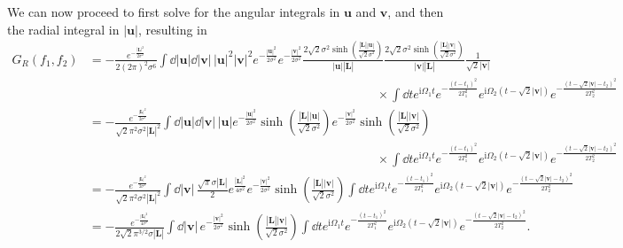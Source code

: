 \documentclass[letterpaper,12pt,titlepage,oneside,final]{book}
\newcommand{\ii}{\mathrm{i}}
\begin{document}
We can now proceed to first solve for the angular integrals in $\bm u$ and $\bm v$, and then the radial integral in $|\bm u|$, resulting in{\footnotesize
\begin{align}
    G_R(f_1,f_2) & = -\frac{e^{- \frac{|\bm L|^2}{2\sigma^2}}}{2(2\pi)^2 \sigma^6} \int   \dd |\bm u| \dd |\bm v| \,|\bm u|^2 |\bm v|^2 e^{-\frac{|\bm u|^2}{2\sigma^2}}e^{-\frac{|\bm v|^2}{2\sigma^2}} \frac{2\sqrt{2} \sigma^2\sinh(\frac{|\bm L||\bm u|}{\sqrt{2}\sigma^2})}{|\bm u||\bm L|}\frac{2\sqrt{2} \sigma^2\sinh(\frac{|\bm L||\bm v|}{\sqrt{2}\sigma^2})}{|\bm v||\bm L|}\frac{1}{\sqrt{2}|\bm v|}\nonumber \\
    &\:\:\:\:\:\:\:\:\:\:\:\:\:\:\:\:\:\:\:\:\:\:\:\:\:\:\:\:\:\:\:\:\:\:\:\:\:\:\:\:\:\:\:\:\:\:\:\:\:\:\:\:\:\:\:\:\:\:\:\:\:\:\:\:\:\:\:\:\:\:\:\:\:\:\:\:\:\:\:\:\:\:\:\:\:\:\:\:\:\:\:\:\:\:\:\:\:\:\:\:\:\:\:\:\:\times\int \dd t e^{\ii \Omega_1 t} e^{- \frac{(t-t_1)^2}{2T_1^2}}e^{\ii \Omega_2 (t - \sqrt{2}|\bm v|)} e^{- \frac{(t - \sqrt{2}|\bm v|-t_2)^2}{2T_2^2}}\nonumber\\
    & = -\frac{e^{- \frac{|\bm L|^2}{2\sigma^2}}}{\sqrt{2}\pi^2\sigma^2|\bm L|^2} \int  \dd |\bm u| \dd |\bm v| \,|\bm u| e^{-\frac{|\bm u|^2}{2\sigma^2}} \sinh(\frac{|\bm L||\bm u|}{\sqrt{2}\sigma^2})e^{-\frac{|\bm v|^2}{2\sigma^2}}\sinh(\frac{|\bm L||\bm v|}{\sqrt{2}\sigma^2})\nonumber\\
    &\:\:\:\:\:\:\:\:\:\:\:\:\:\:\:\:\:\:\:\:\:\:\:\:\:\:\:\:\:\:\:\:\:\:\:\:\:\:\:\:\:\:\:\:\:\:\:\:\:\:\:\:\:\:\:\:\:\:\:\:\:\:\:\:\:\:\:\:\:\:\:\:\:\:\:\:\:\:\:\:\:\:\:\:\:\:\:\:\:\:\:\:\:\:\:\:\:\:\:\:\:\:\:\:\:\times \int \dd t e^{\ii \Omega_1 t} e^{- \frac{(t-t_1)^2}{2T_1^2}}e^{\ii \Omega_2 (t - \sqrt{2}|\bm v|)} e^{- \frac{(t - \sqrt{2}|\bm v|-t_2)^2}{2T_2^2}}\nonumber\\
    & = -\frac{e^{- \frac{|\bm L|^2}{2\sigma^2}}}{\sqrt{2}\pi^2\sigma^2|\bm L|^2} \int  \dd |\bm v| \, \frac{\sqrt{\pi}\sigma |\bm L|}{2}e^{\frac{|\bm L|^2}{4 \sigma^2}}e^{-\frac{|\bm v|^2}{2\sigma^2}} \sinh(\frac{|\bm L||\bm v|}{\sqrt{2}\sigma^2}) \int \dd te^{\ii \Omega_1 t} e^{- \frac{(t-t_1)^2}{2T_1^2}}e^{\ii \Omega_2 (t - \sqrt{2}|\bm v|)} e^{- \frac{(t - \sqrt{2}|\bm v|-t_2)^2}{2T_2^2}}\nonumber\\
    & = -\frac{e^{- \frac{|\bm L|^2}{4\sigma^2}}}{2\sqrt{2}\pi^{3/2}\sigma|\bm L|} \int \dd |\bm v| \, e^{-\frac{|\bm v|^2}{2\sigma^2}} \sinh(\frac{|\bm L||\bm v|}{\sqrt{2}\sigma^2}) \int \dd t e^{\ii \Omega_1 t} e^{- \frac{(t-t_1)^2}{2T_1^2}}e^{\ii \Omega_2 (t - \sqrt{2}|\bm v|)} e^{- \frac{(t - \sqrt{2}|\bm v|-t_2)^2}{2T_2^2}}.\label{eq:GRfinalInt}
\end{align}}
\end{document}
